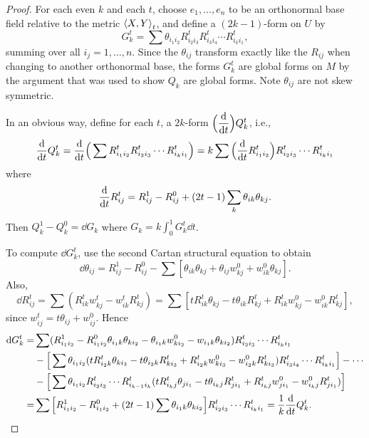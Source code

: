 \documentclass[../main]{subfiles}
\begin{document}
\begin{proof}
For each even $k$ and each $t$, choose $e_1, \dots, e_n$ to be an orthonormal base field relative to the metric $\left\langle X,Y\right\rangle_t$, and define a $(2k-1)$-form on $U$ by \[G_k^t=\sum\theta_{i_1i_2}R_{i_2i_3}^tR_{i_3i_4}^t\cdots R_{i_ki_1}^t,\] summing over all $i_j=1,\dots,n$. Since the $\theta_{i j}$ transform exactly like the $R_{i j}$ when changing to another orthonormal base, the forms $G_k^t$ are global forms on $M$ by the argument that was used to show $Q_k$ are global forms. Note $\theta_{i j}$ are not skew symmetric.

In an obvious way, define for each $t$, a $2k$-form $\Big(\dv{}{t}\Big)Q_k^t$, i.e.,
\[\dv{}{t}Q_k^t=\dv{}{t}\Big(\sum R_{i_1i_2}^tR_{i_2i_3}^t\cdots R_{i_ki_1}^t\Big)=k\sum\Big(\dv{}{t}R_{i_1i_2}^t\Big)R_{i_2i_3}^t\cdots R_{i_ki_1}^t\]
where \[\dv{}{t}R_{i j}^t=R_{i j}^1-R_{i j}^0+(2t-1)\sum_k \theta_{i k} \theta_{k j}.\] Then $Q_k^1-Q_k^0=\dd G_k$ where $G_k=k\displaystyle\int_0^1G_k^t\dd t$.

To compute $\dd G_k^t$, use the second Cartan structural equation to obtain \[\dd\theta_{i j}=R_{ij}^1-R_{ij}^0-\sum[\theta_{i k}\theta_{kj}+\theta_{i j}w_{k j}^0+w_{i k}^0\theta_{k j}].\] Also,
\[\dd R_{i j}^t=\sum(R_{i k}^tw_{k j}^t-w_{i k}^tR_{kj}^t)=\sum[tR_{i k}^t\theta_{k j}-t\theta_{i k}R_{k j}^t+R_{i k}^t w_{k j}^0-w_{i k}^0 R_{k j}^t],\]
since $w_{i j}^t=t \theta_{i j}+w_{i j}^0$. Hence
\begin{align*}
    \dd G_k^t=&\sum(R_{i_1 i_2}^1-R_{i_1 i_2}^0\theta_{i_1k}\theta_{ki_2}-\theta_{i_1k}w_{ki_2}^0-w_{i_1k}\theta_{ki_2})R_{i_2i_3}^t\cdots R_{i_ki_1}^t\\
    &-\Big[\sum\theta_{i_1i_2}(tR_{i_2k}^t\theta_{ki_3}-t\theta_{i_2k}R_{ki_3}^t+R_{i_2k}^tw_{ki_3}^0-w_{i_2k}^0R_{ki_3}^t)R_{i_3i_4}^t\cdots R_{i_ki_1}^t\Big]-\cdots\\
    &-\Big[\sum\theta_{i_1i_2}R_{i_2i_3}^t\cdots R_{i_{k-1}i_k}^t(tR_{i_kj}^t\theta_{ji_1}-t\theta_{i_kj}R_{ji_1}^t+R_{i_kj}^tw_{ji_1}^0-w_{i_kj}^0R_{ji_1}^t)\Big]\\
    =&\sum\Big[R_{i_1i_2}^1-R_{i_1i_2}^0+(2t-1)\sum\theta_{i_1k}\theta_{ki_2}\Big]R_{i_2i_3}^t\cdots R_{i_ki_1}^t=\frac1k\dv{}{t}Q_k^t.
\end{align*}
\end{proof}
\end{document}
